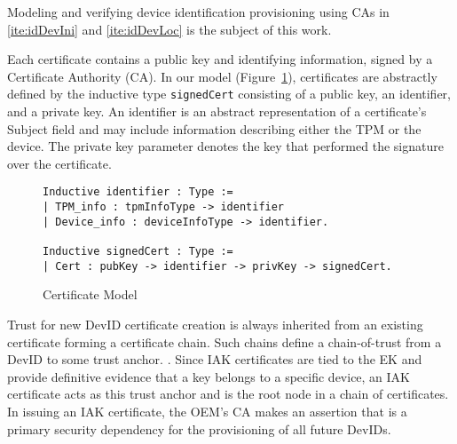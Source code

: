 \documentclass[runningheads]{llncs}
\begin{document}
\noindent Modeling and verifying device identification provisioning
using CAs in \ref{ite:idDevIni} and \ref{ite:idDevLoc} is the subject
of this work.

Each certificate contains a public key and identifying information,
signed by a Certificate Authority (CA). In our model
(Figure~\ref{fig:certificate-model}), certificates are abstractly
defined by the inductive type \verb|signedCert| consisting of a public
key, an identifier, and a private key. An identifier is an abstract
representation of a certificate's Subject field and may include
information describing either the TPM or the device. The private key
parameter denotes the key that performed the signature over the
certificate.

\begin{figure}[hbtp]
\begin{lstlisting}[language=Coq]
Inductive identifier : Type :=
| TPM_info : tpmInfoType -> identifier
| Device_info : deviceInfoType -> identifier.

Inductive signedCert : Type :=
| Cert : pubKey -> identifier -> privKey -> signedCert.
\end{lstlisting}
\caption{Certificate Model}
\label{fig:certificate-model}
\end{figure}

Trust for new DevID certificate creation is always inherited from an
existing certificate forming a certificate chain. Such chains define a
chain-of-trust from a DevID to some trust anchor.
\citep{DevIDSpec-TCG}. Since IAK certificates are tied to the EK
and provide definitive evidence that a key belongs to a specific
device, an IAK certificate acts as this trust anchor and is the root
node in a chain of certificates. In issuing an IAK certificate, the
OEM's CA makes an assertion that is a primary security dependency for
the provisioning of all future DevIDs.
\end{document}
